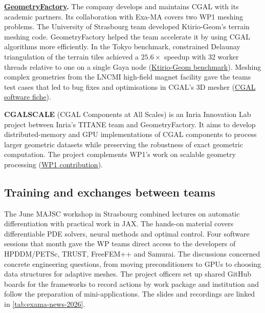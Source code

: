 \begin{samepage}
\textbf{\href{https://geometryfactory.com/CGAL/}{GeometryFactory}.}
The company develops and maintains CGAL with its academic partners.
Its collaboration with Exa-MA covers two WP1 meshing problems.
The University of Strasbourg team developed Ktirio-Geom's terrain
meshing code. GeometryFactory helped the team accelerate it by
using CGAL algorithms more efficiently. In the Tokyo benchmark,
constrained Delaunay triangulation of the terrain tiles
achieved a $25.6\times$ speedup with 32 worker threads relative to one
on a single Gaya node\ifdefined\ExaMAStandaloneManagement\else
\space(\hyperref[sec:app:specs:app-feelpp-ktirio-geom]{Ktirio-Geom benchmark})\fi.
Meshing complex geometries from the LNCMI high-field magnet facility
gave the teams test cases that led to bug fixes and optimisations in
CGAL's 3D mesher\ifdefined\ExaMAStandaloneManagement\else
\space(\hyperref[sec:CGAL:software]{CGAL software fiche})\fi.
\par
\end{samepage}

\textbf{CGALSCALE} (CGAL Components at All Scales) is an Inria Innovation
Lab project between Inria's TITANE team and GeometryFactory. It aims to
develop distributed-memory and GPU implementations of CGAL components
to process larger geometric datasets while preserving the robustness
of exact geometric computation. The project complements WP1's work
on scalable geometry processing\ifdefined\ExaMAStandaloneManagement\else
\space(\hyperref[sec:wp1:cgalscale]{WP1 contribution})\fi.

\subsection{Training and exchanges between teams}

The June MAJSC workshop in Strasbourg combined lectures on automatic
differentiation with practical work in JAX. The hands-on material
covers differentiable PDE solvers, neural methods and optimal control.
Four software sessions that month gave the WP teams direct access to
the developers of HPDDM/PETSc, TRUST, FreeFEM++ and Samurai. The
discussions concerned concrete engineering questions, from moving
preconditioners to GPUs to choosing data structures for adaptive meshes.
The project officers set up shared GitHub boards for the frameworks
to record actions by work package and institution and follow the
preparation of mini-applications. The slides and recordings are linked
in \cref{tab:exama-news-2026}.

